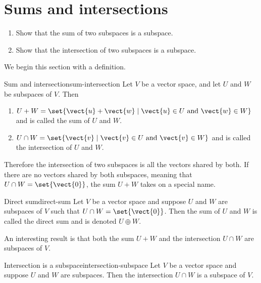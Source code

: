 \section{Sums and intersections}

\begin{outcome}
  \begin{enumerate}
  \item Show that the sum of two subspaces is a subspace.
  \item Show that the intersection of two subspaces is a subspace.
  \end{enumerate}
\end{outcome}

We begin this section with a definition.

\begin{definition}{Sum and intersection}{sum-intersection}
Let $V$ be a vector space, and let $U$ and $W$ be subspaces of
$V$.  
Then
\begin{enumerate}
\item $U+W = \set{\vect{u}+\vect{w} \mid \vect{u}\in U\mbox{ and } \vect{w}\in W}$ and is 
called the sum of $U$ and $W$.

\item $U\cap W = \set{\vect{v} \mid \vect{v}\in U\mbox{ and } \vect{v}\in W}$ and is 
called the intersection of $U$ and $W$.
\end{enumerate}
\end{definition}

Therefore the intersection of two subspaces is all the vectors shared by both. If there are no vectors shared by both subspaces, meaning that $U \cap W = \set{\vect{0} }$, the sum $U+W$ takes on a special name.

\begin{definition}{Direct sum}{direct-sum}
Let $V$ be a vector space and suppose $U$ and $W$ are subspaces of $V$ such that  $U \cap W = \set{\vect{0} }$. Then the sum of $U$ and $W$ is called the direct sum and is denoted $U \oplus W$. 
\end{definition}

An interesting result is that both the sum $U + W$ and the intersection $U \cap W$ are subspaces of $V$. 

\begin{example}{Intersection is a subspace}{intersection-subspace}
Let $V$ be a vector space and suppose $U$ and $W$ are subspaces. Then the intersection $U \cap W$ is a subspace of $V$.
\end{example}


